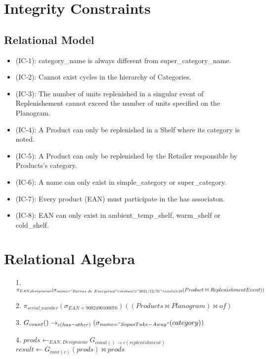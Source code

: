 \documentclass[12pt,a4paper]{report}
\begin{document}


\section*{Integrity Constraints}
\subsection*{Relational Model}
\begin{itemize}
\item (IC-1): category\_name is always different from super\_category\_name.
\item (IC-2): Cannot exist cycles in the hierarchy of Categories.
\item (IC-3): The number of units replenished in a singular event of Replenishement cannot exceed the number of units specified on the Planogram.
\item (IC-4): A Product can only be replenished in a Shelf where its category is noted.
\item (IC-5): A Product can only be replenished by the Retailer responsible by Products's category.
\item (IC-6): A name can only exist in simple\_category or super\_category.
\item (IC-7): Every product (EAN) must participate in the has associaton.
\item (IC-8): EAN can only exist in ambient\_temp\_shelf, warm\_shelf or cold\_shelf.
\end{itemize}



\section*{Relational Algebra}
\begin{enumerate}
\item[1.] $\pi_{EAN, designacao}(\sigma_{name = "Barras\ de\ Energetico" \land  instant > "2021/12/31" \land units > 10 }(Product \Join Replenishment Event))$
\item[2.] $\pi_{serial\_number}(\sigma_{EAN = 9002490100070})((Products \Join Planogram)\Join of)$
\item[3.] $G_{count}() \rightarrow_{c(has-other)}(\sigma_{name = "SopasTake-Away"}(category))$
\item[4.] $prods \leftarrow _{EAN, Designacao}G_{count() \rightarrow c(replenishment)}$ \\
  $result \leftarrow G_{max(c)}(prods) \Join prods$
\end{enumerate}
\end{document}
